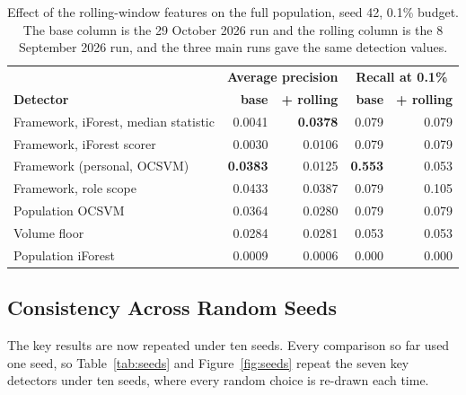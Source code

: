 \documentclass[a4paper,12pt]{article}
\begin{document}
\begin{table}[htbp]
\centering
\caption{Effect of the rolling-window features on the full population, seed 42, 0.1\% budget. The base column is the 29 October 2026 run and the rolling column is the 8 September 2026 run, and the three main runs gave the same detection values.}
\label{tab:temporal}
\small
\begin{tabular}{@{}l r r r r@{}}
\toprule
& \multicolumn{2}{c}{\textbf{Average precision}} & \multicolumn{2}{c}{\textbf{Recall at 0.1\%}} \\
\textbf{Detector} & \textbf{base} & \textbf{+ rolling} & \textbf{base} & \textbf{+ rolling} \\
\midrule
Framework, iForest, median statistic & 0.0041 & \textbf{0.0378} & 0.079 & 0.079 \\
Framework, iForest scorer & 0.0030 & 0.0106 & 0.079 & 0.079 \\
Framework (personal, OCSVM)   & \textbf{0.0383} & 0.0125 & \textbf{0.553} & 0.053 \\
Framework, role scope          & 0.0433 & 0.0387 & 0.079 & 0.105 \\
Population OCSVM               & 0.0364 & 0.0280 & 0.079 & 0.079 \\
Volume floor                          & 0.0284 & 0.0281 & 0.053 & 0.053 \\
Population iForest                     & 0.0009 & 0.0006 & 0.000 & 0.000 \\
\bottomrule
\end{tabular}
\end{table}

\subsection{Consistency Across Random Seeds}
\label{sec:seeds}
The key results are now repeated under ten seeds. Every comparison so far used one seed, so Table~\ref{tab:seeds} and Figure~\ref{fig:seeds} repeat the seven key detectors under ten seeds, where every random choice is re-drawn each time.
\end{document}
